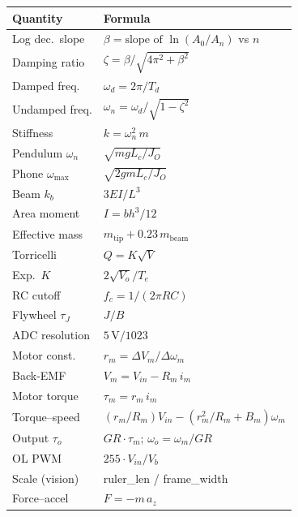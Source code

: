 \documentclass[9pt,twocolumn]{article}
\begin{document}
\begin{center}
\renewcommand{\arraystretch}{1.3}
\small
\begin{tabular}{p{2.6cm}l}
\toprule
\textbf{Quantity} & \textbf{Formula}\\
\midrule
Log dec.\ slope & $\beta = \text{slope of } \ln(A_0/A_n)$ vs $n$\\
Damping ratio & $\zeta = \beta/\sqrt{4\pi^2+\beta^2}$\\
Damped freq. & $\omega_d = 2\pi/T_d$\\
Undamped freq. & $\omega_n = \omega_d/\sqrt{1-\zeta^2}$\\
Stiffness & $k = \omega_n^2\,m$\\
Pendulum $\omega_n$ & $\sqrt{mgL_c/J_O}$\\
Phone $\omega_{\max}$ & $\sqrt{2gm L_c/J_O}$\\
Beam $k_b$ & $3EI/L^3$\\
Area moment & $I = bh^3/12$\\
Effective mass & $m_{\text{tip}} + 0.23\,m_{\text{beam}}$\\
Torricelli & $Q = K\sqrt{V}$\\
Exp.\ $K$ & $2\sqrt{V_o}/T_e$\\
RC cutoff & $f_c = 1/(2\pi RC)$\\
Flywheel $\tau_J$ & $J/B$\\
ADC resolution & $5\,\text{V}/1023$\\
Motor const. & $r_m = \Delta V_m / \Delta\omega_m$\\
Back-EMF & $V_m = V_{in} - R_m\,i_m$\\
Motor torque & $\tau_m = r_m\,i_m$\\
Torque--speed & $(r_m/R_m)V_{in} - (r_m^2/R_m+B_m)\omega_m$\\
Output $\tau_o$ & $GR\cdot\tau_m$; $\omega_o = \omega_m/GR$\\
OL PWM & $255 \cdot V_{in}/V_b$\\
Scale (vision) & ruler\_len / frame\_width\\
Force--accel & $F = -m\,a_z$\\
\bottomrule
\end{tabular}
\end{center}
\end{document}
